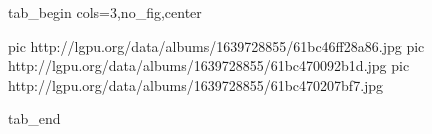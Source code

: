  
 
 
 
 


\ifcmt
  tab_begin cols=3,no_fig,center

     pic http://lgpu.org/data/albums/1639728855/61bc46ff28a86.jpg
		 pic http://lgpu.org/data/albums/1639728855/61bc470092b1d.jpg
		 pic http://lgpu.org/data/albums/1639728855/61bc470207bf7.jpg

  tab_end
\fi
